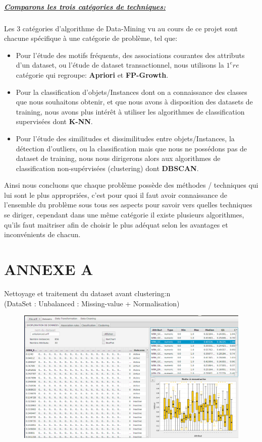 \documentclass[12pt,a4paper,oneside]{book}
\begin{document}
\newpage 
\paragraph{\underline{Comparons les trois catégories de techniques:}}
Les 3 catégories d'algorithme de Data-Mining vu au cours de ce projet sont chacune spécifique à une catégorie de problème, tel que:
\begin{itemize}
	\item Pour l'étude des motifs fréquents, des associations courantes des attributs d'un dataset, ou l'étude de dataset transactionnel, nous utilisons la $1^ere$ catégorie qui regroupe: \textbf{Apriori} et \textbf{FP-Growth}.
	
	\item Pour la classification d'objets/Instances dont on a connaissance des classes que nous souhaitons obtenir, et que nous avons à disposition des datasets de training, nous avons plus intérêt à utiliser les algorithmes de classification supervisées dont \textbf{K-NN}.
	
	\item Pour l'étude des similitudes et dissimilitudes entre objets/Instances, la détection d'outliers, ou la classification mais que nous ne possédons pas de dataset de training, nous nous dirigerons alors aux algorithmes de classification non-supérvisées (clustering) dont \textbf{DBSCAN}.
\end{itemize}

Ainsi nous concluons que chaque problème possède des méthodes / techniques qui lui sont le plus appropriées, c'est pour quoi il faut avoir connaissance de l'ensemble du problème sous tous ses aspects pour savoir vers quelles techniques se diriger, cependant dans une même catégorie il existe plusieurs algorithmes, qu'ils faut maitriser afin de choisir le plus adéquat selon les avantages et inconvénients de chacun.

\newpage

\chapter*{ANNEXE A}
Nettoyage et traitement du dataset avant clustering:n\\
(DataSet : Unbalanced : Missing-value + Normalisation)
\begin{figure}[H]
	\centering
	\includegraphics[scale=0.38]{images/dbscan5-1.png}
	\label{labelname}%
\end{figure}
\end{document}
